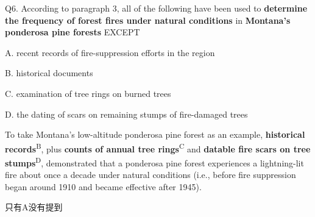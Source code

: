 \begin{blk}
    \begin{qst}
        Q6. According to paragraph 3, all of the following have been used to \textbf{determine the frequency of forest fires under natural conditions} in \textbf{Montana’s ponderosa pine forests} EXCEPT
    \end{qst}

    \begin{chc}
        A. recent records of fire-suppression efforts in the region

        B. historical documents

        C. examination of tree rings on burned trees

        D. the dating of scars on remaining stumps of fire-damaged trees
    \end{chc}

    \begin{psgq}
        To take Montana’s low-altitude ponderosa pine forest as an example, \textbf{historical records}\textsuperscript{B}, plus \textbf{counts of annual tree rings}\textsuperscript{C} and \textbf{datable fire scars on tree stumps}\textsuperscript{D}, demonstrated that a ponderosa pine forest experiences a lightning-lit fire about once a decade under natural conditions (i.e., before fire suppression began around 1910 and became effective after 1945).
    \end{psgq}

    \begin{nlz}
        只有A没有提到
    \end{nlz}
\end{blk}

